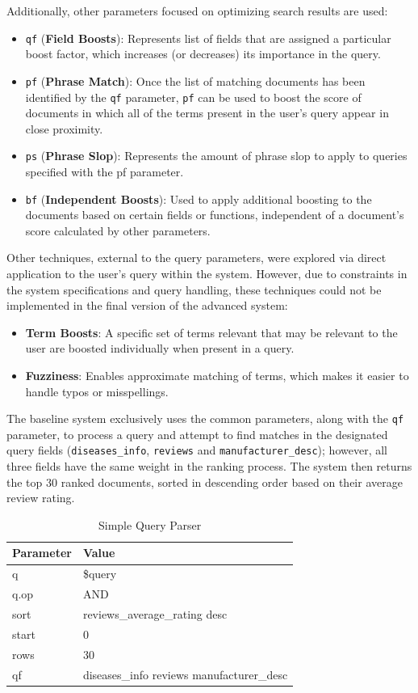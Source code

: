 \documentclass[sigconf]{acmart}
\begin{document}
Additionally, other parameters focused on optimizing search results are used:
\begin{itemize}
    \item \texttt{qf} (\textbf{Field Boosts}): Represents list of fields that are assigned a particular boost factor, which increases (or decreases) its importance in the query.
    \item \texttt{pf} (\textbf{Phrase Match}): Once the list of matching documents has been identified by the \texttt{qf} parameter, \texttt{pf} can be used to boost the score of documents in which all of the terms present in the user's query appear in close proximity.
    \item \texttt{ps} (\textbf{Phrase Slop}): Represents the amount of phrase slop\cite{slop} to apply to queries specified with the pf parameter.
    \item \texttt{bf} (\textbf{Independent Boosts}): Used to apply additional boosting to the documents based on certain fields or functions, independent of a document's score calculated by other parameters.
\end{itemize}

Other techniques, external to the query parameters, were explored via direct application to the user's query within the system. However, due to constraints in the system specifications and query handling, these techniques could not be implemented in the final version of the advanced system:
\begin{itemize}
    \item \textbf{Term Boosts}: A specific set of terms relevant that may be relevant to the user are boosted individually when present in a query.
    \item \textbf{Fuzziness}: Enables approximate matching of terms, which makes it easier to handle typos or misspellings.
\end{itemize}

The baseline system exclusively uses the common parameters, along with the \texttt{qf} parameter, to process a query and attempt to find matches in the designated query fields (\texttt{diseases\_info}, \texttt{reviews} and \texttt{manufacturer\_desc}); however, all three fields have the same weight in the ranking process. The system then returns the top 30 ranked documents, sorted in descending order based on their average review rating.

\begin{table}[H]
    \begin{tabular}{ll}
    \toprule
    Parameter & Value\\
    \midrule
    q & \$query\\
    q.op & AND\\
    sort & reviews\_average\_rating desc\\
    start & 0\\
    rows & 30\\
    qf & diseases\_info reviews manufacturer\_desc\\
    \bottomrule
    \end{tabular}
    \caption{Simple Query Parser}
    \label{tab:simple_query}
\end{table}
\end{document}
